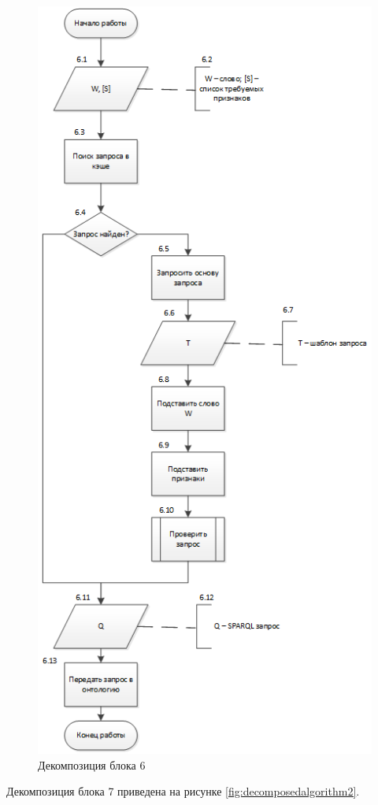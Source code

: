 \begin{figure}[H]
	\centering
		\includegraphics[scale=0.95]{images/decomposedalgorithm1.png}
	\caption{\small Декомпозиция блока 6}
	\label{fig:decomposedalgorithm1}
\end{figure}

Декомпозиция блока 7 приведена на рисунке \ref{fig:decomposedalgorithm2}.

